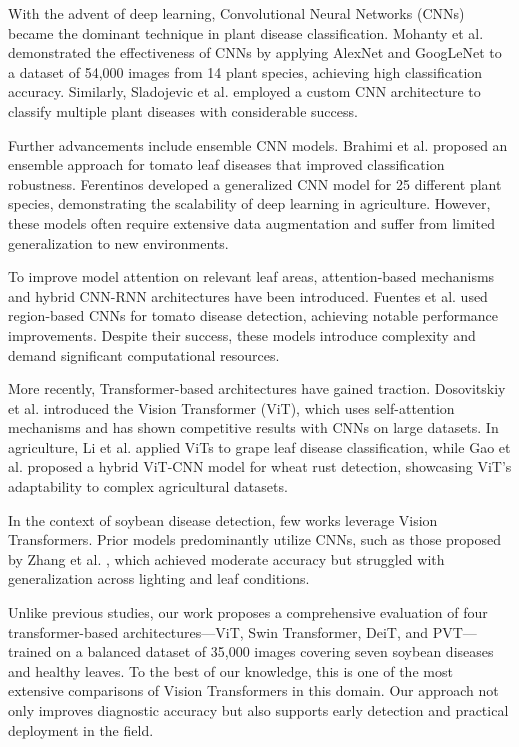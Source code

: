 \documentclass[preprint,12pt]{elsarticle}
\begin{document}
With the advent of deep learning, Convolutional Neural Networks (CNNs) became the dominant technique in plant disease classification. Mohanty et al. \cite{Mohanty2016UsingDL} demonstrated the effectiveness of CNNs by applying AlexNet and GoogLeNet to a dataset of 54,000 images from 14 plant species, achieving high classification accuracy. Similarly, Sladojevic et al. \cite{Sladojevic2016DeepNN} employed a custom CNN architecture to classify multiple plant diseases with considerable success.

Further advancements include ensemble CNN models. Brahimi et al. \cite{Brahimi2017DeepLF} proposed an ensemble approach for tomato leaf diseases that improved classification robustness. Ferentinos \cite{Ferentinos2018DeepLA} developed a generalized CNN model for 25 different plant species, demonstrating the scalability of deep learning in agriculture. However, these models often require extensive data augmentation and suffer from limited generalization to new environments.

To improve model attention on relevant leaf areas, attention-based mechanisms and hybrid CNN-RNN architectures have been introduced. Fuentes et al. \cite{Fuentes2017RobustDC} used region-based CNNs for tomato disease detection, achieving notable performance improvements. Despite their success, these models introduce complexity and demand significant computational resources.

More recently, Transformer-based architectures have gained traction. Dosovitskiy et al. \cite{Dosovitskiy2020AnII} introduced the Vision Transformer (ViT), which uses self-attention mechanisms and has shown competitive results with CNNs on large datasets. In agriculture, Li et al. \cite{Li2023GrapeViT} applied ViTs to grape leaf disease classification, while Gao et al. \cite{Gao2022WheatRust} proposed a hybrid ViT-CNN model for wheat rust detection, showcasing ViT's adaptability to complex agricultural datasets.

In the context of soybean disease detection, few works leverage Vision Transformers. Prior models predominantly utilize CNNs, such as those proposed by Zhang et al. \cite{Zhang2020SoybeanCNN}, which achieved moderate accuracy but struggled with generalization across lighting and leaf conditions.

Unlike previous studies, our work proposes a comprehensive evaluation of four transformer-based architectures—ViT, Swin Transformer, DeiT, and PVT—trained on a balanced dataset of 35,000 images covering seven soybean diseases and healthy leaves. To the best of our knowledge, this is one of the most extensive comparisons of Vision Transformers in this domain. Our approach not only improves diagnostic accuracy but also supports early detection and practical deployment in the field.
\end{document}
